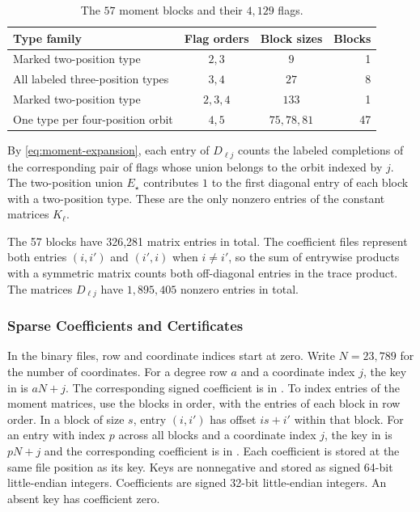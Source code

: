 \documentclass[preprint,11pt,numbers]{elsarticle-arxiv}
\numberwithin{equation}{section}
\theoremstyle{definition}
\begin{document}
\begin{table}[htbp]
\centering
\caption{The $57$ moment blocks and their $4{,}129$ flags.}
\label{tab:blocks}
\begin{tabular}{@{}lccr@{}}
\toprule
Type family & Flag orders & Block sizes & Blocks\\
\midrule
Marked two-position type & $2,3$ & $9$ & 1\\
All labeled three-position types & $3,4$ & $27$ & 8\\
Marked two-position type & $2,3,4$ & $133$ & 1\\
One type per four-position orbit & $4,5$ & $75,78,81$ & 47\\
\bottomrule
\end{tabular}
\end{table}

By \eqref{eq:moment-expansion}, each entry of $D_{\ell j}$ counts the
labeled completions of the corresponding pair of flags whose union
belongs to the orbit indexed by $j$. The two-position union
$E_\star$ contributes $1$ to the first diagonal entry of each
block with a two-position type. These are the only nonzero
entries of the constant matrices $K_\ell$.

The 57 blocks have 326,281 matrix entries in total. The coefficient
files represent both entries $(i,i')$ and $(i',i)$ when $i\ne i'$,
so the sum of entrywise products with a symmetric matrix counts both
off-diagonal entries in the trace product. The matrices $D_{\ell j}$
have $1{,}895{,}405$ nonzero entries in total.

\subsubsection{Sparse Coefficients and Certificates}

In the binary files, row and coordinate indices start at zero. Write
$N=23{,}789$ for the number of coordinates. For a degree row $a$ and
a coordinate index $j$, the key in
 is $aN+j$. The corresponding signed coefficient
is in . To index entries of the moment matrices, use the
blocks in  order, with the entries of each block
in row order. In a block of size $s$, entry $(i,i')$ has offset
$is+i'$ within that block.
For an entry with index $p$ across all blocks and a coordinate index $j$,
the key in  is $pN+j$ and the corresponding coefficient
is in . Each coefficient is stored at the same
file position as its key. Keys are nonnegative and stored as signed
64-bit little-endian integers. Coefficients are signed 32-bit
little-endian integers. An absent key has coefficient zero.
\end{document}
